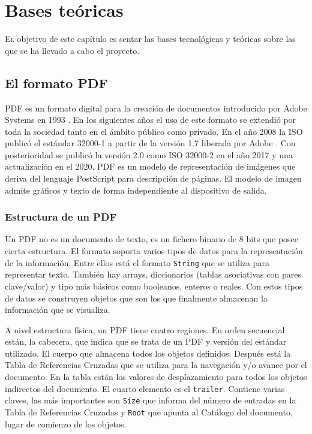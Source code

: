 
\chapter{Bases teóricas}
\label{chap:fundamentos-teoricos}

\lettrine{E}l objetivo de este capítulo es sentar las bases tecnológicas y teóricas sobre las que se ha llevado a cabo el proyecto.

\section{El formato PDF}

PDF es un formato digital para la creación de documentos introducido por Adobe Systems en 1993 \cite{adobe_systems_inc_quick_2010,canonicalltd.UbuntuManpagePdfinfo}. En los siguientes años el uso de este formato se extendió por toda la sociedad tanto en el ámbito público como privado. En el año 2008 la ISO publicó el estándar 32000-1 a partir de la versión 1.7 liberada por Adobe \cite{adobe_systems_inc_iso_2008}. Con posterioridad se publicó la versión 2.0 como ISO 32000-2 \cite{international_organization_for_standardization_iso_2017} en el año 2017 y una actualización en el 2020. PDF es un modelo de representación de imágenes que deriva del lenguaje PostScript para descripción de páginas. El modelo de imagen admite gráficos y texto de forma independiente al dispositivo de salida.

\subsection{Estructura de un PDF}

Un PDF no es un documento de texto, es un fichero binario de 8 bits que posee cierta estructura. El formato soporta varios tipos de datos para la representación de la información. Entre ellos está el formato \verb|String| que se utiliza para representar texto. También hay arrays, diccionarios (tablas asociativas con pares clave/valor) y tipo más básicos como booleanos, enteros o reales. Con estos tipos de datos se construyen objetos que son los que finalmente almacenan la información que se visualiza.

A nivel estructura física, un PDF tiene cuatro regiones. En orden secuencial están, la cabecera, que indica que se trata de un PDF y versión del estándar utilizado. El cuerpo que almacena todos los objetos definidos. Después está la Tabla de Referencias Cruzadas que se utiliza para la navegación y/o avance por el documento. En la tabla están los valores de desplazamiento para todos los objetos indirectos del documento. El cuarto elemento es el \verb|trailer|. Contiene varias claves, las más importantes son \verb|Size| que informa del número de entradas en la Tabla de Referencias Cruzadas y \verb|Root| que apunta al Catálogo del documento, lugar de comienzo de los objetos.

